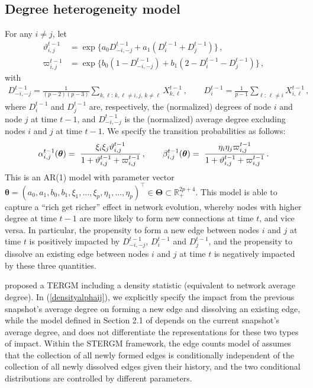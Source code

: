 \documentclass[12pt]{article}
\newcommand{\bTheta}{\boldsymbol \Theta}
\newcommand{\btheta}{\boldsymbol \theta}
\def\T{{\scriptscriptstyle \top} }
\newcommand{\0}{{\bf 0}}
\begin{document}
\subsection{Degree heterogeneity model}  \label{sec:density}
\vspace{-0.1cm}
For any $i\neq j$, let 
\begin{align*}
\vartheta_{i,j}^{t-1} &= \exp\{ a_0 D_{-i,-j}^{t-1}
    + a_1 (D_{i}^{t-1} +  D_{j}^{t-1})\}\,,\\
\varpi_{i,j}^{t-1} &=  \exp\{ b_0 (1-D_{-i,-j}^{t-1})
    + b_1 (2-D_{i}^{t-1}- D_{j}^{t-1})\}\,,
    \end{align*}
with
\begin{align*} 
D_{-i,-j}^{t-1}= \frac{1}{(p-2)(p-3)}\sum_{k,\ell:\, k,\ell \neq i,j,\, k \neq \ell} X_{k, \ell}^{t-1}\,,\qquad D_i^{t-1}= \frac{1}{p-1}\sum_{\ell:\,\ell \ne i} X_{i, \ell}^{t-1}\,,
\end{align*}
where $D_i^{t-1}$ and
$D_j^{t-1}$ are, respectively, the (normalized) degrees of node $i$ and node $j$ at time $t-1$, and $D_{-i,-j}^{t-1}$ is the (normalized) average degree excluding nodes $i$ and $j$ at time $t-1$.
We specify the transition probabilities %
as follows:
\begin{align} \label{densityalphaij}
    \alpha_{i,j}^{t-1}(\btheta) = ~ { \xi_i \xi_j \vartheta_{i,j}^{t-1}
   \over 1 +\vartheta_{i,j}^{t-1} + \varpi_{i,j}^{t-1}} \,,
    \qquad
    \beta_{i,j}^{t-1}(\btheta) =~   { \eta_i \eta_j \varpi_{i,j}^{t-1}
   \over 1 +\vartheta_{i,j}^{t-1} + \varpi_{i,j}^{t-1}}\,.
     \end{align} 
This is an AR(1) model with parameter vector $\btheta= (a_0, a_1,  b_0, b_1,  \xi_1, \ldots, \xi_p, \eta_1, \ldots, \eta_p)^{\T}\in\bTheta\subset\mathbb{R}_+^{2p+4}$. %
This model is able to capture a ``rich get richer'' effect in network evolution, whereby nodes with higher degree at time $t-1$ are more likely to form new connections at time $t$, and vice versa.
In particular, the propensity to form a new edge between nodes $i$ and $j$ at time $t$ is positively impacted by 
$D_{-i,-j}^{t-1}$, $D_i^{t-1}$ and $D_j^{t-1}$, and the propensity to dissolve an existing edge between nodes $i$ and $j$ at time $t$ is negatively impacted by these three quantities. 

\cite{hanneke2010} proposed a TERGM including a density statistic (equivalent to network average degree). In (\ref{densityalphaij}), we explicitly specify the impact from the previous snapshot's average degree on forming a new edge and dissolving an existing edge, while the model defined in Section 2.1 of \cite{hanneke2010} depends on the current snapshot's average degree, and does not differentiate the representations for these two types of impact. 
Within the STERGM framework, the edge counts model of \cite{krivitsky2014} assumes that the collection of all newly formed edges is conditionally independent of the collection of all newly dissolved edges given their history, and the two conditional distributions are controlled by different parameters.
\end{document}
